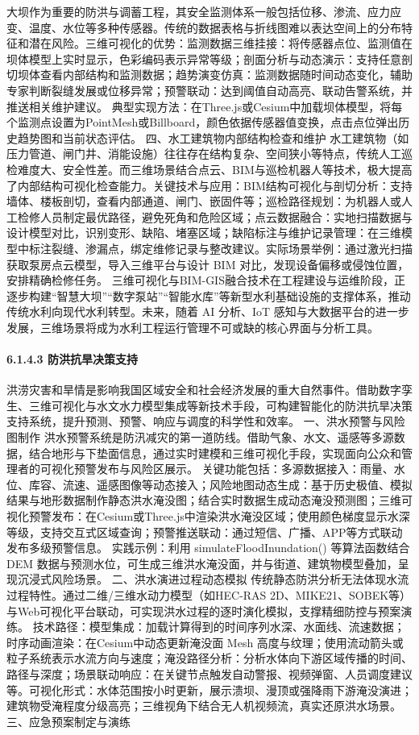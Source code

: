 大坝作为重要的防洪与调蓄工程，其安全监测体系一般包括位移、渗流、应力应变、温度、水位等多种传感器。传统的数据表格与折线图难以表达空间上的分布特征和潜在风险。三维可视化的优势：监测数据三维挂接：将传感器点位、监测值在坝体模型上实时显示，色彩编码表示异常等级；剖面分析与动态演示：支持任意剖切坝体查看内部结构和监测数据；趋势演变仿真：监测数据随时间动态变化，辅助专家判断裂缝发展或位移异常；预警联动：达到阈值自动高亮、联动告警系统，并推送相关维护建议。 典型实现方法：在Three.js或Cesium中加载坝体模型，将每个监测点设置为PointMesh或Billboard，颜色依据传感器值变换，点击点位弹出历史趋势图和当前状态评估。 四、水工建筑物内部结构检查和维护 水工建筑物（如压力管道、闸门井、消能设施）往往存在结构复杂、空间狭小等特点，传统人工巡检难度大、安全性差。而三维场景结合点云、BIM与巡检机器人等技术，极大提高了内部结构可视化检查能力。关键技术与应用：BIM结构可视化与剖切分析：支持墙体、楼板剖切，查看内部通道、闸门、嵌固件等；巡检路径规划：为机器人或人工检修人员制定最优路径，避免死角和危险区域；点云数据融合：实地扫描数据与设计模型对比，识别变形、缺陷、堵塞区域；缺陷标注与维护记录管理：在三维模型中标注裂缝、渗漏点，绑定维修记录与整改建议。实际场景举例：通过激光扫描获取泵房点云模型，导入三维平台与设计 BIM 对比，发现设备偏移或侵蚀位置，安排精确检修任务。 三维可视化与BIM-GIS融合技术在工程建设与运维阶段，正逐步构建``智慧大坝''``数字泵站''``智能水库''等新型水利基础设施的支撑体系，推动传统水利向现代水利转型。未来，随着 AI 分析、IoT 感知与大数据平台的进一步发展，三维场景将成为水利工程运行管理不可或缺的核心界面与分析工具。 \paragraph{6.1.4.3 防洪抗旱决策支持}\label{ux9632ux6d2aux6297ux65f1ux51b3ux7b56ux652fux6301} 洪涝灾害和旱情是影响我国区域安全和社会经济发展的重大自然事件。借助数字孪生、三维可视化与水文水力模型集成等新技术手段，可构建智能化的防洪抗旱决策支持系统，提升预测、预警、响应与调度的科学性和效率。 一、洪水预警与风险图制作 洪水预警系统是防汛减灾的第一道防线。借助气象、水文、遥感等多源数据，结合地形与下垫面信息，通过实时建模和三维可视化手段，实现面向公众和管理者的可视化预警发布与风险区展示。 关键功能包括：多源数据接入：雨量、水位、库容、流速、遥感图像等动态接入；风险地图动态生成：基于历史极值、模拟结果与地形数据制作静态洪水淹没图；结合实时数据生成动态淹没预测图；三维可视化预警发布：在Cesium或Three.js中渲染洪水淹没区域；使用颜色梯度显示水深等级，支持交互式区域查询；预警推送联动：通过短信、广播、APP等方式联动发布多级预警信息。 实践示例：利用 simulateFloodInundation() 等算法函数结合 DEM 数据与预测水位，可生成三维洪水淹没面，并与街道、建筑物模型叠加，呈现沉浸式风险场景。 二、洪水演进过程动态模拟 传统静态防洪分析无法体现水流过程特性。通过二维/三维水动力模型（如HEC-RAS 2D、MIKE21、SOBEK等）与Web可视化平台联动，可实现洪水过程的逐时演化模拟，支撑精细防控与预案演练。 技术路径：模型集成：加载计算得到的时间序列水深、水面线、流速数据；时序动画渲染：在Cesium中动态更新淹没面 Mesh 高度与纹理；使用流动箭头或粒子系统表示水流方向与速度；淹没路径分析：分析水体向下游区域传播的时间、路径与深度；场景联动响应：在关键节点触发自动警报、视频弹窗、人员调度建议等。可视化形式：水体范围按小时更新，展示溃坝、漫顶或强降雨下游淹没演进；建筑物受淹程度分级高亮；三维视角下结合无人机视频流，真实还原洪水场景。 三、应急预案制定与演练 